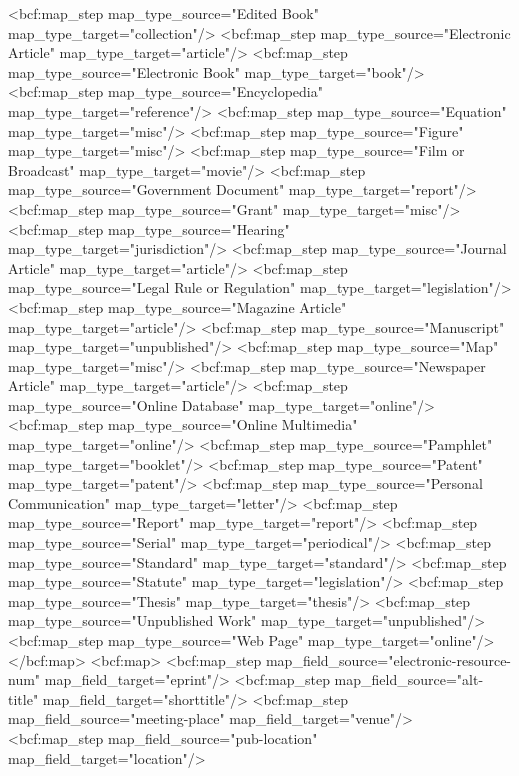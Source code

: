         <bcf:map_step map_type_source="Edited Book" map_type_target="collection"/>
        <bcf:map_step map_type_source="Electronic Article" map_type_target="article"/>
        <bcf:map_step map_type_source="Electronic Book" map_type_target="book"/>
        <bcf:map_step map_type_source="Encyclopedia" map_type_target="reference"/>
        <bcf:map_step map_type_source="Equation" map_type_target="misc"/>
        <bcf:map_step map_type_source="Figure" map_type_target="misc"/>
        <bcf:map_step map_type_source="Film or Broadcast" map_type_target="movie"/>
        <bcf:map_step map_type_source="Government Document" map_type_target="report"/>
        <bcf:map_step map_type_source="Grant" map_type_target="misc"/>
        <bcf:map_step map_type_source="Hearing" map_type_target="jurisdiction"/>
        <bcf:map_step map_type_source="Journal Article" map_type_target="article"/>
        <bcf:map_step map_type_source="Legal Rule or Regulation" map_type_target="legislation"/>
        <bcf:map_step map_type_source="Magazine Article" map_type_target="article"/>
        <bcf:map_step map_type_source="Manuscript" map_type_target="unpublished"/>
        <bcf:map_step map_type_source="Map" map_type_target="misc"/>
        <bcf:map_step map_type_source="Newspaper Article" map_type_target="article"/>
        <bcf:map_step map_type_source="Online Database" map_type_target="online"/>
        <bcf:map_step map_type_source="Online Multimedia" map_type_target="online"/>
        <bcf:map_step map_type_source="Pamphlet" map_type_target="booklet"/>
        <bcf:map_step map_type_source="Patent" map_type_target="patent"/>
        <bcf:map_step map_type_source="Personal Communication" map_type_target="letter"/>
        <bcf:map_step map_type_source="Report" map_type_target="report"/>
        <bcf:map_step map_type_source="Serial" map_type_target="periodical"/>
        <bcf:map_step map_type_source="Standard" map_type_target="standard"/>
        <bcf:map_step map_type_source="Statute" map_type_target="legislation"/>
        <bcf:map_step map_type_source="Thesis" map_type_target="thesis"/>
        <bcf:map_step map_type_source="Unpublished Work" map_type_target="unpublished"/>
        <bcf:map_step map_type_source="Web Page" map_type_target="online"/>
      </bcf:map>
      <bcf:map>
        <bcf:map_step map_field_source="electronic-resource-num" map_field_target="eprint"/>
        <bcf:map_step map_field_source="alt-title" map_field_target="shorttitle"/>
        <bcf:map_step map_field_source="meeting-place" map_field_target="venue"/>
        <bcf:map_step map_field_source="pub-location" map_field_target="location"/>
